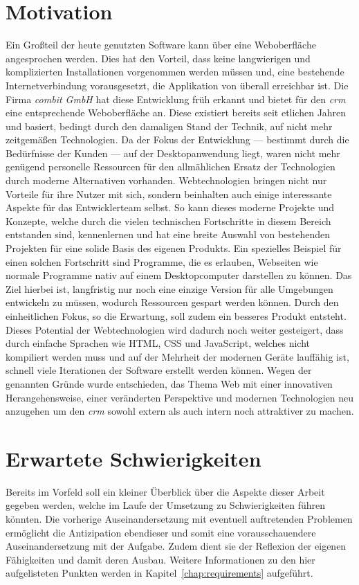 \section{Motivation}
Ein Großteil der heute genutzten Software kann über eine Weboberfläche angesprochen werden. Dies hat den Vorteil, dass keine langwierigen und komplizierten Installationen vorgenommen werden müssen und, eine bestehende Internetverbindung vorausgesetzt, die Applikation von überall erreichbar ist. Die Firma \textit{combit GmbH} hat diese Entwicklung früh erkannt und bietet für den \textit{\gls{crm}} eine entsprechende Weboberfläche an. Diese existiert bereits seit etlichen Jahren und basiert, bedingt durch den damaligen Stand der Technik, auf nicht mehr zeitgemäßen Technologien. Da der Fokus der Entwicklung --- bestimmt durch die Bedürfnisse der Kunden --- auf der Desktopanwendung liegt, waren nicht mehr genügend personelle Ressourcen für den allmählichen Ersatz der Technologien durch moderne Alternativen vorhanden.
Webtechnologien bringen nicht nur Vorteile für ihre Nutzer mit sich, sondern beinhalten auch einige interessante Aspekte für das Entwicklerteam selbst. So kann dieses moderne Projekte und Konzepte, welche durch die vielen technischen Fortschritte in diesem Bereich entstanden sind, kennenlernen und hat eine breite Auswahl von bestehenden Projekten für eine solide Basis des eigenen Produkts. Ein spezielles Beispiel für einen solchen Fortschritt sind Programme, die es erlauben, Webseiten wie normale Programme nativ auf einem Desktopcomputer darstellen zu können. Das Ziel hierbei ist, langfristig nur noch eine einzige Version für alle Umgebungen entwickeln zu müssen, wodurch Ressourcen gespart werden können. Durch den einheitlichen Fokus, so die Erwartung, soll zudem ein besseres Produkt entsteht. Dieses Potential der Webtechnologien wird dadurch noch weiter gesteigert, dass durch einfache Sprachen wie HTML, CSS und JavaScript, welches nicht kompiliert werden muss und auf der Mehrheit der modernen Geräte lauffähig ist, schnell viele Iterationen der Software erstellt werden können.
Wegen der genannten Gründe wurde entschieden, das Thema Web mit einer innovativen Herangehensweise, einer veränderten Perspektive und modernen Technologien neu anzugehen um den \textit{\gls{crm}} sowohl extern als auch intern noch attraktiver zu machen.

\section{Erwartete Schwierigkeiten}
Bereits im Vorfeld soll ein kleiner Überblick über die Aspekte dieser Arbeit gegeben werden, welche im Laufe der Umsetzung zu Schwierigkeiten führen könnten. Die vorherige Auseinandersetzung mit eventuell auftretenden Problemen ermöglicht die Antizipation ebendieser und somit eine vorausschauendere Auseinandersetzung mit der Aufgabe. Zudem dient sie der Reflexion der eigenen Fähigkeiten und damit deren Ausbau. Weitere Informationen zu den hier aufgelisteten Punkten werden in Kapitel~\ref{chap:requirements} aufgeführt.

